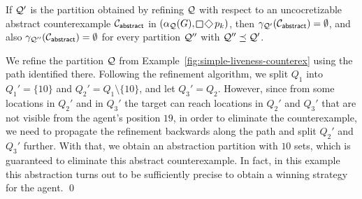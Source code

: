 \begin{theorem}If $\mathcal{Q}'$ is the partition 
obtained by refining $\mathcal{Q}$ with respect to an uncocretizable abstract counterexample $\mathcal{C}_{\mathsf{abstract}}$ in $(\alpha_\part(G),\LTLglobally\LTLfinally p_k)$, then $\gamma_{\mathcal{Q}'}(\mathcal{C}_{\mathsf{abstract}}) = \emptyset$, and also $\gamma_{\mathcal{Q}''}(\mathcal{C}_{\mathsf{abstract}}) = \emptyset$ for every partition $\mathcal{Q}''$ with $\mathcal{Q}'' \preceq \mathcal{Q}'$.
\end{theorem}

\begin{example}\label{ex:simple-liveness-refinement}
We refine the partition $\mathcal{Q}$ from Example~\ref{fig:simple-liveness-counterex} using the path identified there. Following the refinement algorithm, we split $Q_1$ into $Q_1' = \{10\}$ and $Q_2' = Q_1 \setminus \{10\}$, and let $Q_3' = Q_2$. However, since from some locations in $Q_2'$ and in $Q_3'$ the target can reach locations in $Q_2'$ and $Q_3'$ that are not visible from the agent's position $19$, in order to eliminate the counterexample, we need to propagate the refinement backwards along the path and split $Q_2'$ and $Q_3'$ further. With that, we obtain an abstraction partition with $10$ sets, which is guaranteed to eliminate this abstract counterexample. In fact, in this example this abstraction turns out to be sufficiently precise to obtain a winning strategy for the agent.
\qed
\end{example}
